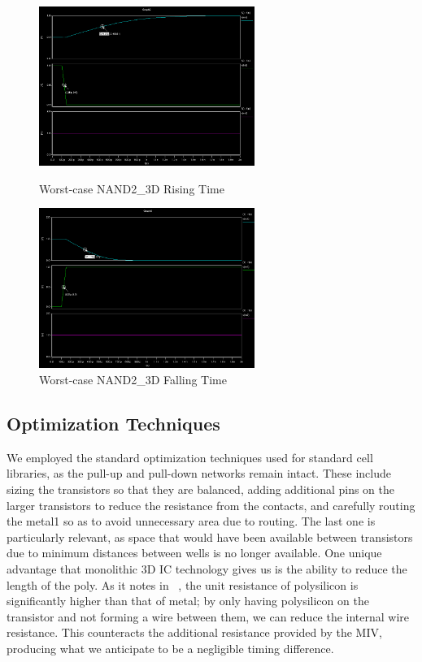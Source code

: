 \documentclass{article}
\begin{document}
\begin{figure}
\centering
\parbox{8cm}{
\includegraphics[width=7cm]{3d_rising}
  \caption{Worst-case NAND2\_3D Rising Time}
\label{3d_rising}}
\qquad
\begin{minipage}{7cm}
\includegraphics[width=7cm]{3d_falling}
  \caption{Worst-case NAND2\_3D Falling Time}
\label{3d_falling}
\end{minipage}
\end{figure}
\subsection{Optimization Techniques} We employed the standard optimization techniques used for standard cell libraries, as the pull-up and pull-down networks remain intact. These include sizing the transistors so that they are balanced, adding additional pins on the larger transistors to reduce the resistance from the contacts, and carefully routing the metal1 so as to avoid unnecessary area due to routing. The last one is particularly relevant, as space that would have been available between transistors due to minimum distances between wells is no longer available. One unique advantage that monolithic 3D IC technology gives us is the ability to reduce the length of the poly. As it notes in ~\cite{ULTRA}, the unit resistance of polysilicon is significantly higher than that of metal; by only having polysilicon on the transistor and not forming a wire between them, we can reduce the internal wire resistance. This counteracts the additional resistance provided by the MIV, producing what we anticipate to be a negligible timing difference.  
\end{document}
